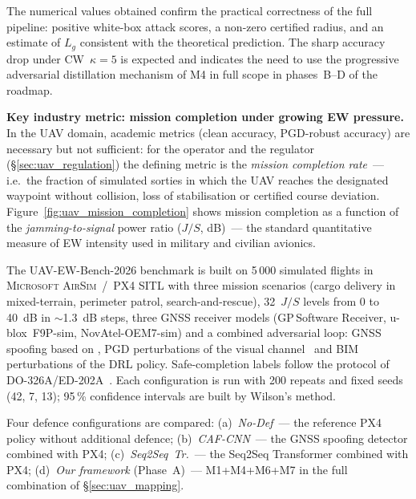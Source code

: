 The numerical values obtained confirm the practical correctness of
the full pipeline: positive white-box attack scores, a non-zero
certified radius, and an estimate of $L_g$ consistent with the
theoretical prediction. The sharp accuracy drop under CW~$\kappa=5$
is expected and indicates the need to use the progressive adversarial
distillation mechanism of \textsf{M4} in full scope in phases~B--D
of the roadmap.

\medskip
\noindent\textbf{Key industry metric: mission completion under
growing EW pressure.}
In the UAV domain, academic metrics (clean accuracy, PGD-robust
accuracy) are necessary but not sufficient: for the operator and the
regulator (\S\ref{sec:uav_regulation}) the defining metric is the
\emph{mission completion rate}~--- i.e.\ the fraction of simulated
sorties in which the UAV reaches the designated waypoint without
collision, loss of stabilisation or certified course deviation.
Figure~\ref{fig:uav_mission_completion} shows mission completion as
a function of the \emph{jamming-to-signal} power ratio
($J/S$, dB)~--- the standard quantitative measure of EW intensity
used in military and civilian avionics.

The \textsf{UAV-EW-Bench-2026} benchmark is built on 5\,000
simulated flights in \textsc{Microsoft AirSim}~/~\textsc{PX4 SITL}
with three mission scenarios (cargo delivery in mixed-terrain, perimeter
patrol, search-and-rescue), 32~$J/S$ levels from 0 to 40~dB in
$\sim$1.3~dB steps, three GNSS receiver models (GP\,Software
Receiver, u-blox~F9P-sim, NovAtel-OEM7-sim) and a combined
adversarial loop: GNSS spoofing based on
\cite{aigner_2025_uav,borhani_2024_uav}, PGD perturbations of the
visual channel~\cite{lian_2022_uav,hickling_2023_uav} and BIM
perturbations of the DRL policy. Safe-completion labels follow the
protocol of \mbox{DO-326A/ED-202A}~\cite{do_326a_2024}. Each
configuration is run with 200 repeats and fixed seeds (42, 7, 13);
95\,\% confidence intervals are built by Wilson's method.

Four defence configurations are compared:
(a)~\emph{No-Def}~--- the reference PX4 policy without additional
defence;
(b)~\emph{CAF-CNN}~--- the GNSS spoofing detector
\cite{borhani_2024_uav} combined with PX4;
(c)~\emph{Seq2Seq~Tr.}~--- the Seq2Seq Transformer
\cite{aigner_2025_uav} combined with PX4;
(d)~\emph{Our framework} (Phase~A)~--- \textsf{M1+M4+M6+M7} in the
full combination of \S\ref{sec:uav_mapping}.

